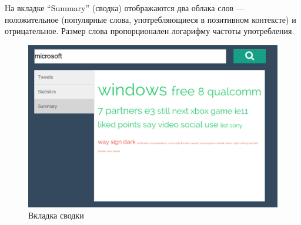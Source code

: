 На вкладке ``Summary'' (сводка) отображаются два облака слов --- положительное 
(популярные слова, употребляющиеся в позитивном контексте) и отрицательное.
Размер слова пропорционален логарифму частоты употребления.
\begin{figure}[!ht]
\begin{center}
\includegraphics[scale=0.4, trim=0mm 0mm 0mm 0mm, clip]{../resources/screens/4.png}
\caption{Вкладка сводки}
\label{gr:summary}
\end{center}
\end{figure} 
